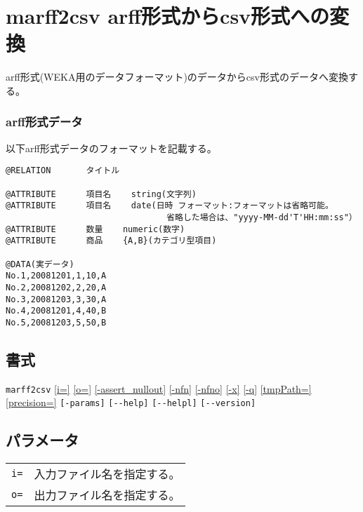 
%

\section{marff2csv arff形式からcsv形式への変換\label{sect:marff2csv}}
arff形式(WEKA用のデータフォーマット)のデータからcsv形式のデータへ変換する。

\subsubsection*{arff形式データ}
以下arff形式データのフォーマットを記載する。
\begin{Verbatim}[baselinestretch=0.7,frame=single,fontsize=\small]
@RELATION       タイトル

@ATTRIBUTE      項目名    string(文字列)
@ATTRIBUTE      項目名    date(日時 フォーマット:フォーマットは省略可能。
                                省略した場合は、"yyyy-MM-dd'T'HH:mm:ss"）
@ATTRIBUTE      数量    numeric(数字)
@ATTRIBUTE      商品    {A,B}(カテゴリ型項目)

@DATA(実データ)
No.1,20081201,1,10,A
No.2,20081202,2,20,A
No.3,20081203,3,30,A
No.4,20081201,4,40,B
No.5,20081203,5,50,B
\end{Verbatim}

\subsection*{書式}
\verb|marff2csv|
\hyperref[sect:option_i]{[i=]}
\hyperref[sect:option_o]{[o=]}
\hyperref[sect:option_assert_nullout]{[-assert\_nullout]}
\hyperref[sect:option_nfn]{[-nfn]} 
\hyperref[sect:option_nfno]{[-nfno]}
\hyperref[sect:option_x]{[-x]}
\hyperref[sect:option_q]{[-q]}
\hyperref[sect:option_option_tmppath]{[tmpPath=]}
\hyperref[sect:option_precision]{[precision=]}
\verb|[-params]|
\verb|[--help]|
\verb|[--helpl]|
\verb|[--version]|\\

\subsection*{パラメータ}
\begin{table}[htbp]

{\small
\begin{tabular}{ll}
\verb|i=|    & 入力ファイル名を指定する。\\
\verb|o=|    & 出力ファイル名を指定する。\\
\end{tabular}
}
\end{table}

